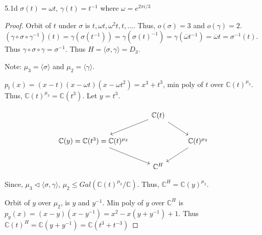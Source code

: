 \documentclass{article}
\newcommand{\C}{\mathbb{C}}
\newcommand{\angles}[1]{\langle #1 \rangle}
\begin{document}
\begin{PROB}{5.1d}\label{Problem 5.1d.}
    $\sigma(t) = \omega t$, $\gamma(t) = t^{-1}$ where $\omega = e^{2 \pi i / 3}$   
\end{PROB}
\begin{proof}
    Orbit of $t$ under $\sigma$ is $t, \omega t, \omega^2 t, t, \dots$. Thus, $o(\sigma) = 3$ and $o(\gamma) = 2$. $(\gamma \circ \sigma \circ \gamma^{-1})(t) = \gamma(\sigma(t^{-1})) = \gamma(\sigma(t)^{-1}) = \gamma(\overline{\omega} t^{-1}) = \overline{\omega} t = \sigma^{-1}(t)$. Thus $\gamma \circ \sigma \circ \gamma = \sigma^{-1}$. Thus $H = \angles{\sigma, \gamma} = D_3$. 

    Note: $\mu_3 = \angles{\sigma}$ and $\mu_2 = \angles{\gamma}$.   

    $p_t(x) = (x - t)(x - \omega t)(x - \omega t^{2})= x^3 + t^3$, min poly of $t$ over $\C(t)^{\mu_3}$. Thus, $\C(t)^{\mu_3} = \C(t^3)$. Let $y = t^3$.   
    
    \[\begin{tikzcd}
        & {\C(t)} \\
        {\C(y) = \C(t^3) = \C(t)^{\mu_3}} && {\C(t)^{\mu_2}} \\
        & {\C^H}
        \arrow[from=1-2, to=2-1]
        \arrow[from=1-2, to=2-3]
        \arrow[from=2-1, to=3-2]
        \arrow[from=2-3, to=3-2]
    \end{tikzcd}\]
    
    Since, $\mu_3 \triangleleft \angles{\sigma, \gamma}$, $\mu_2 \leq Gal(\C(t)^{\mu_3} / \C)$. Thus, $\C^H = \C(y)^{\mu_2}$. 
    
    Orbit of $y$ over $\mu_2$, is $y$ and $y^{-1}$. Min poly of $y$ over $\C^H$ is $p_y(x) = (x - y)(x - y^{-1}) = x^2 - x(y + y^{-1}) + 1$. Thus $\C(t)^H = \C(y + y^{-1}) = \C(t^3 + t^{-3})$    
\end{proof}

\bigskip
\end{document}
